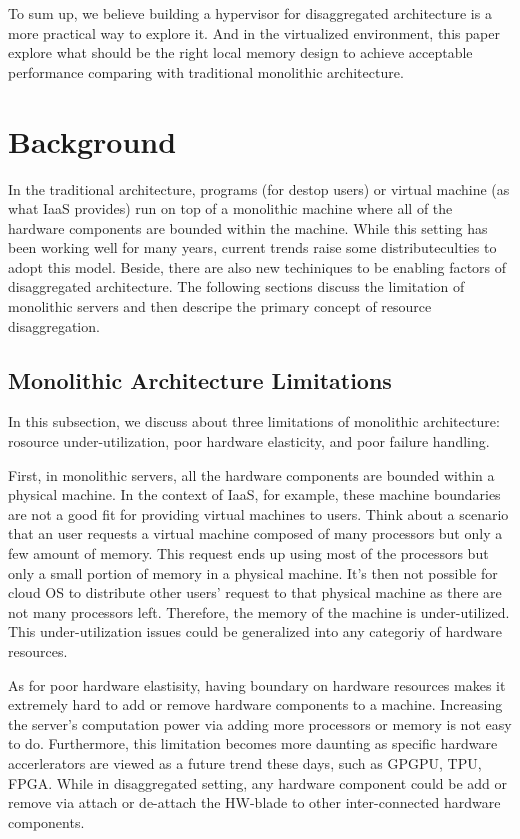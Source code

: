 \documentclass[twocolumn]{article}
\begin{document}
To sum up, we believe building a hypervisor for disaggregated architecture is a more practical way to explore it. And in the virtualized environment, this paper explore what should be the right local memory design to achieve acceptable performance comparing with traditional monolithic architecture.

\section{Background}

In the traditional architecture, programs (for destop users) or virtual machine (as what IaaS provides) run on top of a monolithic machine where all of the hardware components are bounded within the machine.  While this setting has been working well for many years, current trends raise some distributeculties to adopt this model. Beside, there are also new techiniques to be enabling factors of disaggregated architecture.  The following sections discuss the limitation of monolithic servers and then descripe the primary concept of resource disaggregation.

\subsection{Monolithic Architecture Limitations}
In this subsection, we discuss about three limitations of monolithic architecture: rosource under-utilization, poor hardware elasticity, and poor failure handling.

First, in monolithic servers, all the hardware components are bounded within a physical machine. In the context of IaaS, for example, these machine boundaries are not a good fit for providing virtual machines to users. Think about a scenario that an user requests a virtual machine composed of many processors but only a few amount of memory. This request ends up using most of the processors but only a small portion of memory in a physical machine. It's then not possible for cloud OS to distribute other users' request to that physical machine as there are not many processors left. Therefore, the memory of the machine is under-utilized. This under-utilization issues could be generalized into any categoriy of hardware resources.

As for poor hardware elastisity, having boundary on hardware resources makes it extremely hard to add or remove hardware components to a machine. Increasing the server's computation power via adding more processors or memory is not easy to do. Furthermore, this limitation becomes more daunting as specific hardware accerlerators are viewed as a future trend these days\cite{Heterogeous_computing}, such as GPGPU\cite{Google_GPGPU}, TPU\cite{TPU}, FPGA\cite{Datacenter_FPGA}. While in disaggregated setting, any hardware component could be add or remove via attach or de-attach the HW-blade to other inter-connected hardware components.
\end{document}
